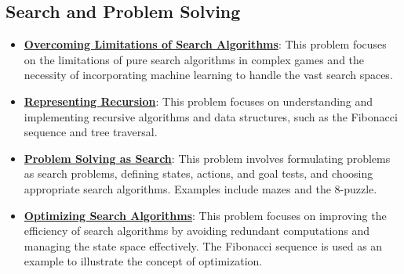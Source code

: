 \documentclass{article}%
\begin{document}
\subsection{Search and Problem Solving}%
\label{subsec:SearchandProblemSolving}%
\begin{itemize}[leftmargin=*]%
\item \href{https://purdue.brightspace.com/d2l/common/assets/pdfjs-d2l-dist/1.0.14-legacy/web/viewer.html?file=\%2Fcontent\%2Fenforced\%2F1095467-wl.202510.CS.24300.001\%2F02L2-Intro.pdf\%3Fou\%3D1095467\&lang=en-us\&container=d2l-fileviewer-rendered-pdf\&fullscreen=d2l-fileviewer-rendered-pdf-dialog\&height=667#page=12}{\textbf{Overcoming Limitations of Search Algorithms}}: This problem focuses on the limitations of pure search algorithms in complex games and the necessity of incorporating machine learning to handle the vast search spaces.%
\item \href{https://purdue.brightspace.com/d2l/common/assets/pdfjs-d2l-dist/1.0.14-legacy/web/viewer.html?file=\%2Fcontent\%2Fenforced\%2F1095467-wl.202510.CS.24300.001\%2F14L1-DepthFS.pdf\%3Fou\%3D1095467\&lang=en-us\&container=d2l-fileviewer-rendered-pdf\&fullscreen=d2l-fileviewer-rendered-pdf-dialog\&height=667#page=3}{\textbf{Representing Recursion}}: This problem focuses on understanding and implementing recursive algorithms and data structures, such as the Fibonacci sequence and tree traversal.%
\item \href{https://purdue.brightspace.com/d2l/common/assets/pdfjs-d2l-dist/1.0.14-legacy/web/viewer.html?file=\%2Fcontent\%2Fenforced\%2F1095467-wl.202510.CS.24300.001\%2F14L1-DepthFS.pdf\%3Fou\%3D1095467\&lang=en-us\&container=d2l-fileviewer-rendered-pdf\&fullscreen=d2l-fileviewer-rendered-pdf-dialog\&height=667#page=14}{\textbf{Problem Solving as Search}}: This problem involves formulating problems as search problems, defining states, actions, and goal tests, and choosing appropriate search algorithms. Examples include mazes and the 8-puzzle.%
\item \href{https://purdue.brightspace.com/d2l/common/assets/pdfjs-d2l-dist/1.0.14-legacy/web/viewer.html?file=\%2Fcontent\%2Fenforced\%2F1095467-wl.202510.CS.24300.001\%2F14L1-DepthFS.pdf\%3Fou\%3D1095467\&lang=en-us\&container=d2l-fileviewer-rendered-pdf\&fullscreen=d2l-fileviewer-rendered-pdf-dialog\&height=667#page=21}{\textbf{Optimizing Search Algorithms}}: This problem focuses on improving the efficiency of search algorithms by avoiding redundant computations and managing the state space effectively. The Fibonacci sequence is used as an example to illustrate the concept of optimization.%

\end{itemize}
\end{document}
